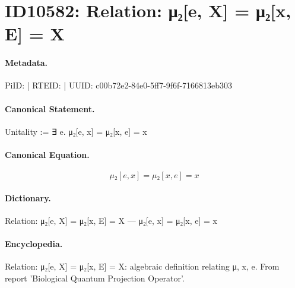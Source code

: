 \section*{ID10582: Relation: μ₂[e, X] = μ₂[x, E] = X}
\paragraph{Metadata.}
PiID:  | RTEID:  | UUID: c00b72e2-84e0-5ff7-9f6f-7166813eb303

\paragraph{Canonical Statement.}
Unitality := ∃ e. μ₂[e, x] = μ₂[x, e] = x

\paragraph{Canonical Equation.}
\[
μ₂[e, x] = μ₂[x, e] = x
\]

\paragraph{Dictionary.}
Relation: μ₂[e, X] = μ₂[x, E] = X — μ₂[e, x] = μ₂[x, e] = x

\paragraph{Encyclopedia.}
Relation: μ₂[e, X] = μ₂[x, E] = X: algebraic definition relating μ, x, e. From report 'Biological Quantum Projection Operator'.
